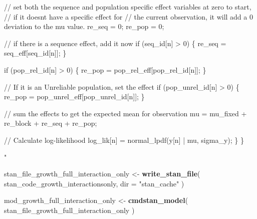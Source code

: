 \documentclass[
]{article}
\newenvironment{Shaded}{\begin{snugshade}}{\end{snugshade}}
\newcommand{\AttributeTok}[1]{\textcolor[rgb]{0.13,0.29,0.53}{#1}}
\newcommand{\FunctionTok}[1]{\textcolor[rgb]{0.13,0.29,0.53}{\textbf{#1}}}
\newcommand{\NormalTok}[1]{#1}
\newcommand{\OtherTok}[1]{\textcolor[rgb]{0.56,0.35,0.01}{#1}}
\newcommand{\StringTok}[1]{\textcolor[rgb]{0.31,0.60,0.02}{#1}}
\begin{document}
\begin{Shaded}
\begin{Highlighting}[]
\StringTok{    // set both the sequence and population specific effect variables at zero to start, }
\StringTok{    // if it doesn\textquotesingle{}t have a specific effect for}
\StringTok{    // the current observation, it will add a 0 deviation to the mu value. }
\StringTok{    re\_seq = 0;}
\StringTok{    re\_pop = 0;}

\StringTok{    // if there is a sequence effect, add it now}
\StringTok{    if (seq\_id[n] \textgreater{} 0) \{}
\StringTok{      re\_seq = seq\_eff[seq\_id[n]];}
\StringTok{    \}}

\StringTok{    if (pop\_rel\_id[n] \textgreater{} 0) \{}
\StringTok{      re\_pop = pop\_rel\_eff[pop\_rel\_id[n]];}
\StringTok{    \}}

\StringTok{    // If it is an Unreliable population, set the effect }
\StringTok{    if (pop\_unrel\_id[n] \textgreater{} 0) \{}
\StringTok{      re\_pop = pop\_unrel\_eff[pop\_unrel\_id[n]];}
\StringTok{    \}}

\StringTok{    // sum the effects to get the expected mean for observation }
\StringTok{    mu = mu\_fixed + re\_block + re\_seq + re\_pop;}

\StringTok{    // Calculate log{-}likelihood }
\StringTok{    log\_lik[n] = normal\_lpdf(y[n] | mu, sigma\_y);}
\StringTok{  \}}
\StringTok{\}}

\StringTok{"}
\end{Highlighting}
\end{Shaded}

\begin{Shaded}
\begin{Highlighting}[]
\NormalTok{stan\_file\_growth\_full\_interaction\_only }\OtherTok{\textless{}{-}} \FunctionTok{write\_stan\_file}\NormalTok{(}
\NormalTok{  stan\_code\_growth\_interactionsonly,}
  \AttributeTok{dir =} \StringTok{"stan\_cache"}
\NormalTok{)}
\end{Highlighting}
\end{Shaded}

\begin{Shaded}
\begin{Highlighting}[]
\NormalTok{mod\_growth\_full\_interaction\_only }\OtherTok{\textless{}{-}} \FunctionTok{cmdstan\_model}\NormalTok{(}
\NormalTok{  stan\_file\_growth\_full\_interaction\_only}
\NormalTok{)}
\end{Highlighting}
\end{Shaded}
\end{document}
